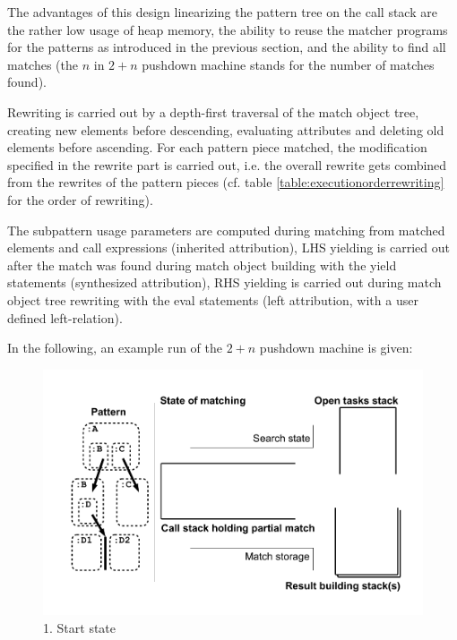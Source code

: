 The advantages of this design linearizing the pattern tree on the call stack are the rather low usage of heap memory, the ability to reuse the matcher programs for the patterns as introduced in the previous section, and the ability to find all matches (the $n$ in $2+n$ pushdown machine stands for the number of matches found).

Rewriting is carried out by a depth-first traversal of the match object tree, creating new elements before descending, evaluating attributes and deleting old elements before ascending. 
For each pattern piece matched, the modification specified in the rewrite part is carried out, i.e. the overall rewrite gets combined from the rewrites of the pattern pieces (cf. table \ref{table:executionorderrewriting} for the order of rewriting).

The subpattern usage parameters are computed during matching from matched elements and call expressions (inherited attribution), LHS yielding is carried out after the match was found during match object building with the yield statements (synthesized attribution), RHS yielding is carried out during match object tree rewriting with the eval statements (left attribution, with a user defined left-relation).

In the following, an example run of the $2+n$ pushdown machine is given:

\vspace{16cm} %

\begin{figure}[htbp]
  \centering
  \includegraphics[width=\textwidth]{fig/Passungszustand1}
  \caption{1. Start state}
  \label{figmatchingstate1}
\end{figure}

